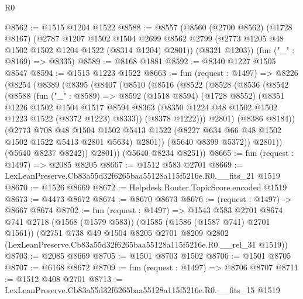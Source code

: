 \begin{lexlean}{R0}
\begin{coremodule}
@8562 := @1515 @1204 @1522
@8588 := @8557
    (@8560
      (@2700 @8562)
      (@1728 @8167)
      (@2787
        @1207
        @1502
        @1504
        @2699
        @8562
        @2799
        (@2773 @1205 @48 @1502 @1502 @1204 @1522 (@8314 @1204) @2801))
      (@8321 @1203))
    (fun ("_" : @8169) => @8335)
@8589 := @8168 @1881
@8592 := @8340 @1227 @1505 @8547
@8594 := @1515 @1223 @1522
@8663 := fun (request : @1497) =>
  @8226
    (@8254
      (@8389
        (@8395
          (@8407
            (@8510
              (@8516
                (@8522
                  (@8528
                    (@8536
                      (@8542
                        (@8588
                          (fun ("_" : @8589) =>
                          @8592
                            (@1518 @8594)
                            (@1728 @8552)
                            (@8351
                              @1226
                              @1502
                              @1504
                              @1517
                              @8594
                              @8363
                              (@8350 @1224 @48 @1502 @1502 @1223 @1522 (@8372 @1223) @8333))
                            (@8378 @1222)))
                        @2801)
                      (@8386 @8184))
                    (@2773
                      @708
                      @48
                      @1504
                      @1502
                      @5413
                      @1522
                      (@8227 @634 @66 @48 @1502 @1502 @1522 @5413 @2801 @5634)
                      @2801))
                  (@5640 @8399 @5372))
                @2801))
            (@5640 @8237 @8242))
          @2801))
      (@5640 @8234 @8251))
@8665 := fun (request : @1497) => @2085 @8205
@8667 := @1512 @583 @2701
@8669 := LexLeanPreserve.Cb83a55d32f6265baa55128a115f5216e.R0.__fits_21 @1519
@8670 := @1526 @8669
@8672 := Helpdesk.Router.TopicScore.encoded @1519
@8673 := @4473 @8672
@8674 := @8670 @8673
@8676 := (request : @1497) -> @8667 @8674
@8702 := fun (request : @1497) =>
  @1543
    @583
    @2701
    @8674
    @741
    @2718
    (@1568 (@1579 @583))
    (@1585 (@1586 (@1587 @741) @2701 @1561))
    (@2751
      @738
      @49
      @1504
      @8205
      @2701
      @8209
      @2802
      (LexLeanPreserve.Cb83a55d32f6265baa55128a115f5216e.R0.__rel_31 @1519))
@8703 := @2085 @8669
@8705 := @1501 @8703 @1502
@8706 := @1501 @8705
@8707 := @6168 @8672
@8709 := fun (request : @1497) => @8706 @8707
@8711 := @1512 @408 @2701
@8713 := LexLeanPreserve.Cb83a55d32f6265baa55128a115f5216e.R0.__fits_15 @1519

\end{coremodule}
\end{lexlean}
